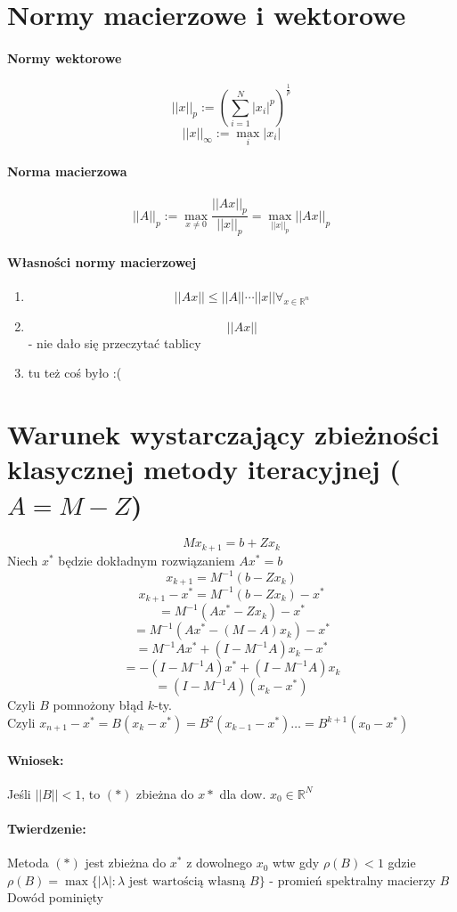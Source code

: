 \documentclass{article}
\begin{document}
\section{Normy macierzowe i wektorowe}
\paragraph{Normy wektorowe}
$$ ||x||_{p}:=(\sum_{i=1}^{N}|x_i|^p)^\frac1p $$
$$ ||x||_\infty:=\max_i |x_i| $$
\paragraph{Norma macierzowa}
$$ ||A||_p := \max_{x\not=0}\frac{||Ax||_p}{||x||_p}=\max_{||x||_p}||Ax||_p $$
\paragraph{Własności normy macierzowej}
\begin{enumerate}
	\item $$||Ax||\leq||A||\dotsm||x|| \forall_{x\in\mathbb{R}^n}$$
	\item $$ ||Ax|| $$ - nie dało się przeczytać tablicy
	\item tu też coś było :(
\end{enumerate}

\section{Warunek wystarczający zbieżności klasycznej metody iteracyjnej ($A=M-Z$)}
\begin{equation}
Mx_{k+1}=b+Zx_k\tag{$*$}
\end{equation}
Niech $x^*$ będzie dokładnym rozwiązaniem $Ax^*=b$
$$x_{k+1}=M^{-1}(b-Zx_k)$$
$$x_{k+1}-x^*=M^{-1}(b-Zx_k)-x^*$$
$$=M^{-1}(Ax^*-Zx_k)-x^*$$
$$=M^{-1}(Ax^*-(M-A)x_k)-x^*$$
$$=M^{-1}Ax^*+(I-M^{-1}A)x_k-x^*$$
$$=-(I-M^{-1}A)x^*+(I-M^{-1}A)x_k$$
$$=(I-M^{-1}A)(x_k-x^*)$$
Czyli $B$ pomnożony błąd $k$-ty.\\
Czyli $ x_{n+1}-x^*=B(x_k-x^*)=B^2(x_{k-1}-x^*)\ldots=B^{k+1}(x_0-x^*) $

\paragraph{Wniosek:} Jeśli $ ||B||<1 $, to $(*)$ zbieżna do $x*$ dla dow. $x_0\in \mathbb{R}^N$

\paragraph{Twierdzenie:} Metoda $ (*) $ jest zbieżna do $ x^* $ z dowolnego $ x_0 $ wtw gdy $ \rho(B)<1 $
 gdzie $ \rho(B)=\max\{|\lambda|:\lambda \text{ jest wartością własną }B\} $ - promień spektralny macierzy $ B $
 Dowód pominięty
\end{document}
